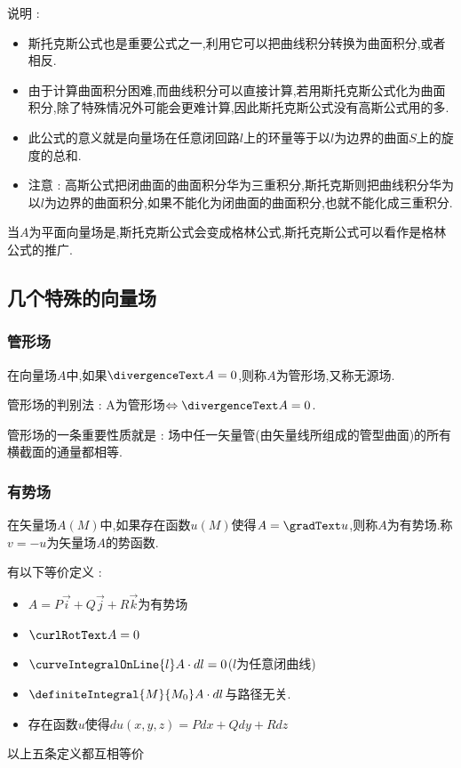 {{{{      说明 :
      \begin{itemize}
        \item 斯托克斯公式也是重要公式之一,利用它可以把曲线积分转换为曲面积分,或者相反.
        \item 由于计算曲面积分困难,而曲线积分可以直接计算,若用斯托克斯公式化为曲面积分,除了特殊情况外可能会更难计算,因此斯托克斯公式没有高斯公式用的多.
        \item 此公式的意义就是向量场在任意闭回路$l$上的环量等于以$l$为边界的曲面$S$上的旋度的总和.
        \item 注意 : 高斯公式把闭曲面的曲面积分华为三重积分,斯托克斯则把曲线积分华为以$l$为边界的曲面积分,如果不能化为闭曲面的曲面积分,也就不能化成三重积分.
      \end{itemize}

      当$A$为平面向量场是,斯托克斯公式会变成格林公式,斯托克斯公式可以看作是格林公式的推广.
    }%

  }%

  \subsection{几个特殊的向量场}{

    \subsubsection{管形场}{
      在向量场$A$中,如果$\divergenceText A = 0$,则称$A$为管形场,又称无源场.

      管形场的判别法 : A为管形场$\Leftrightarrow \divergenceText A = 0$.

      管形场的一条重要性质就是 : 场中任一矢量管(由矢量线所组成的管型曲面)的所有横截面的通量都相等.
    }%

    \subsubsection{有势场}{
      在矢量场$A(M)$中,如果存在函数$u(M)$使得$A = \gradText u$,则称$A$为有势场.称$v = -u$为矢量场$A$的势函数.

      有以下等价定义 :
      \begin{itemize}
        \item $A = P\vec{i} + Q\vec{j} + R\vec{k}$为有势场
        \item $\curlRotText A = 0$
        \item $\curveIntegralOnLine{l} A \cdot dl = 0$($l$为任意闭曲线)
        \item $\definiteIntegral{M}{M_0}A \cdot dl$与路径无关.
        \item 存在函数$u$使得$du(x,y,z) = Pdx + Qdy + Rdz$
      \end{itemize}
      以上五条定义都互相等价

}}}}
